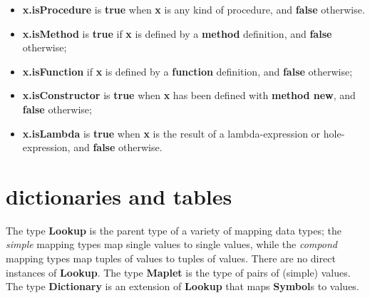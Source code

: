\documentclass{report}
\begin{document}
\begin{itemize}\item {\bf x.isProcedure} is {\bf true} when {\bf x} is any kind of procedure, and {\bf false}
otherwise.

\item {\bf x.isMethod} is {\bf true} if {\bf x} is defined by a {\bf method} definition, and {\bf false}
otherwise;

\item {\bf x.isFunction} if {\bf x} is defined by a {\bf function} definition, and {\bf false}
otherwise;

\item {\bf x.isConstructor} is {\bf true} when {\bf x} has been defined with {\bf method new}, and
{\bf false} otherwise;

\item {\bf x.isLambda} is {\bf true} when {\bf x} is the result of a lambda-expression or
hole-expression, and {\bf false} otherwise.

\end{itemize}

\section{dictionaries and tables}


The type {\bf Lookup} is the parent type of a variety of mapping data types; the
{\em simple} mapping types map single values to single values, while the {\em compond}
mapping types map tuples of values to tuples of values. There are no direct
instances of {\bf Lookup}. The type {\bf Maplet} is the type of pairs of (simple)
values. The type {\bf Dictionary} is an extension of {\bf Lookup} that maps {\bf Symbol}s
to values.
\end{document}
